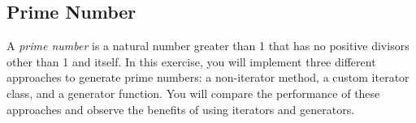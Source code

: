 \documentclass[oneside,11pt,dvipsnames]{book}
\begin{document}


\subsection{Prime Number}\label{exercise:prime-number}

A \emph{prime number} is a natural number greater than 1 that has no positive divisors other than 1 and itself. In this exercise, you will implement three different approaches to generate prime numbers: a non-iterator method, a custom iterator class, and a generator function. You will compare the performance of these approaches and observe the benefits of using iterators and generators.
\end{document}

